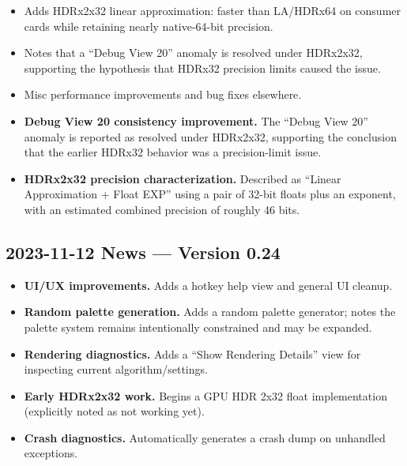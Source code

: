 \begin{itemize}
  
  \item Adds HDRx2x32 linear approximation: faster than LA/HDRx64 on consumer
  cards while retaining nearly native-64-bit precision.
  
  \item Notes that a “Debug View 20” anomaly is resolved under HDRx2x32,
  supporting the hypothesis that HDRx32 precision limits caused the issue.
  
  \item Misc performance improvements and bug fixes elsewhere.

  \item \textbf{Debug View 20 consistency improvement.} The ``Debug View 20''
  anomaly is reported as resolved under HDRx2x32, supporting the conclusion that
  the earlier HDRx32 behavior was a precision-limit issue.

  \item \textbf{HDRx2x32 precision characterization.} Described as ``Linear
  Approximation + Float EXP'' using a pair of 32-bit floats plus an exponent,
  with an estimated combined precision of roughly 46 bits.

\end{itemize}


\subsection{2023-11-12 News --- Version 0.24}

\begin{itemize}
\item \textbf{UI/UX improvements.} Adds a hotkey help view and general UI
cleanup.
\item \textbf{Random palette generation.} Adds a random palette generator; notes
the palette system remains intentionally constrained and may be expanded.
\item \textbf{Rendering diagnostics.} Adds a ``Show Rendering Details'' view for
inspecting current algorithm/settings.
\item \textbf{Early HDRx2x32 work.} Begins a GPU HDR 2x32 float implementation
(explicitly noted as not working yet).
\item \textbf{Crash diagnostics.} Automatically generates a crash dump on
unhandled exceptions.
\end{itemize}


